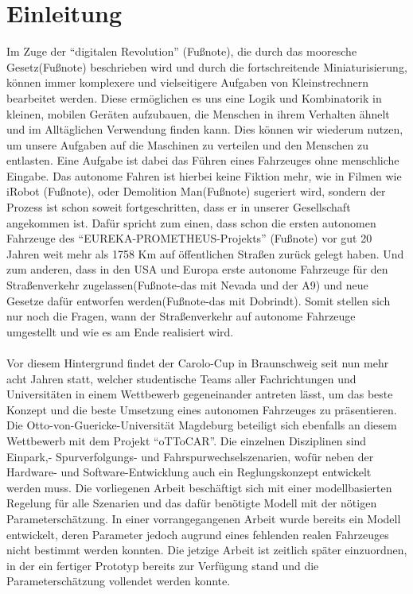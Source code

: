 \section{Einleitung}
Im Zuge der "`digitalen Revolution"' (Fußnote), die durch das mooresche Gesetz(Fußnote) beschrieben wird und durch die fortschreitende Miniaturisierung, können immer komplexere und vielseitigere Aufgaben von Kleinstrechnern bearbeitet werden. Diese ermöglichen es uns eine Logik und Kombinatorik in kleinen, mobilen Geräten aufzubauen, die Menschen in ihrem Verhalten ähnelt und im Alltäglichen Verwendung finden kann. Dies können wir wiederum nutzen, um unsere Aufgaben auf die Maschinen zu verteilen und den Menschen zu entlasten. Eine Aufgabe ist dabei das Führen eines Fahrzeuges ohne menschliche Eingabe. Das autonome Fahren ist hierbei keine Fiktion mehr, wie in Filmen wie iRobot (Fußnote), oder Demolition Man(Fußnote) sugeriert wird, sondern der Prozess ist schon soweit fortgeschritten, dass er in unserer Gesellschaft angekommen ist. Dafür spricht zum einen, dass schon die ersten autonomen Fahrzeuge des "`EUREKA-PROMETHEUS-Projekts"' (Fußnote) vor gut 20 Jahren weit mehr als 1758 Km auf öffentlichen Straßen zurück gelegt haben. Und zum anderen, dass in den USA und Europa erste autonome Fahrzeuge für den Straßenverkehr zugelassen(Fußnote-das mit Nevada und der A9) und neue Gesetze dafür entworfen werden(Fußnote-das mit Dobrindt). Somit stellen sich nur noch die Fragen, wann der Straßenverkehr auf autonome Fahrzeuge umgestellt und wie es am Ende realisiert wird.\\ \\
Vor diesem Hintergrund findet der Carolo-Cup in Braunschweig seit nun mehr acht Jahren statt, welcher studentische Teams aller Fachrichtungen und Universitäten in einem Wettbewerb gegeneinander antreten lässt, um das beste Konzept und die beste Umsetzung eines autonomen Fahrzeuges zu präsentieren. Die Otto-von-Guericke-Universität Magdeburg beteiligt sich ebenfalls an diesem Wettbewerb mit dem Projekt "`oTToCAR"'. Die einzelnen Disziplinen sind Einpark,- Spurverfolgungs- und Fahrspurwechselszenarien, wofür neben der Hardware- und Software-Entwicklung auch ein Reglungskonzept entwickelt werden muss. Die vorliegenen Arbeit beschäftigt sich mit einer modellbasierten Regelung für alle Szenarien und das dafür benötigte Modell mit der nötigen Parameterschätzung. In einer vorrangegangenen Arbeit \cite{VikAnd} wurde bereits ein Modell entwickelt, deren Parameter jedoch augrund eines fehlenden realen Fahrzeuges nicht bestimmt werden konnten. Die jetzige Arbeit ist zeitlich später einzuordnen, in der ein fertiger Prototyp bereits zur Verfügung stand und die Parameterschätzung vollendet werden konnte.